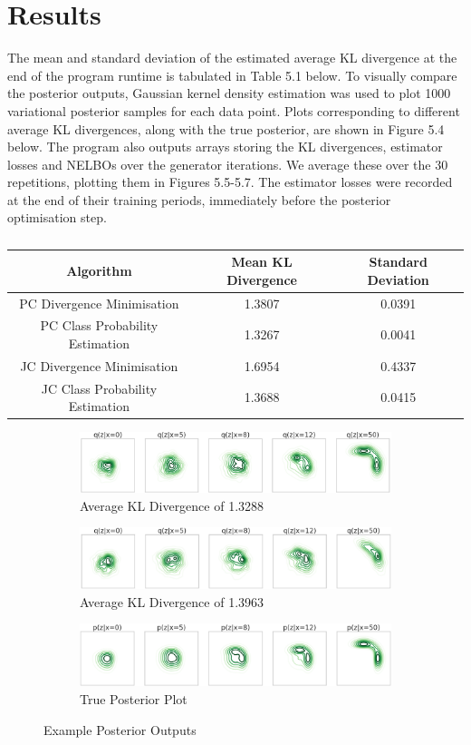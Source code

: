 \documentclass[honours,12pt]{unswthesis}
\newcommand{\E}{\mathbb{E}}
\numberwithin{equation}{section}
\theoremstyle{definition}
\begin{document}
\section{Results}
The mean and standard deviation of the estimated average KL divergence %
at the end of the program runtime is tabulated in Table 5.1 below. To visually compare the posterior outputs, Gaussian kernel density estimation was used to plot 1000 variational posterior samples for each data point. Plots corresponding to different average KL divergences, along with the true posterior, are shown in Figure 5.4 below. The program also outputs arrays storing the KL divergences, estimator losses and NELBOs over the generator iterations. We average these over the 30 repetitions, plotting them in Figures 5.5-5.7. The estimator losses were recorded at the end of their training periods, immediately before the posterior optimisation step.
\begin{table}[h!]
\begin{tabular}{|c|c|c|}
\hline
Algorithm & Mean KL Divergence & Standard Deviation\\
\hline
PC Divergence Minimisation & 1.3807 & 0.0391\\
\hline
PC Class Probability Estimation & 1.3267 & 0.0041\\
\hline
JC Divergence Minimisation & 1.6954 & 0.4337\\
\hline
JC Class Probability Estimation & 1.3688 & 0.0415\\
\hline
\end{tabular}
\caption{}
\end{table}
\begin{figure}[h!]
\begin{subfigure}{\textwidth}
\includegraphics[width=\textwidth]{13288.png}
\caption{Average KL Divergence of 1.3288}
\end{subfigure}
\begin{subfigure}{\textwidth}
\includegraphics[width=\textwidth]{13963.png}
\caption{Average KL Divergence of 1.3963}
\end{subfigure}
\begin{subfigure}{\textwidth}
\includegraphics[width=\textwidth]{sprinklertrue}
\caption{True Posterior Plot}
\end{subfigure}
\caption{Example Posterior Outputs}
\end{figure}
\end{document}
